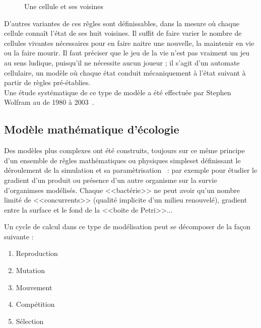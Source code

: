 \documentclass[11pt,twoside,a4paper]{article}
\begin{document}
\begin{figure}[H]
	\centerline {}
	\caption{Une cellule et ses voisines}
	\label{fig:cellneighboor}
\end{figure}

D'autres variantes de ces r{\^e}gles sont d{\'e}finissables, dans la mesure o{\`u} chaque cellule conna{\^i}t l'{\'e}tat de ses huit voisines. Il suffit de faire varier le nombre de cellules vivantes n{\'e}cessaires pour en faire naitre une nouvelle, la maintenir en vie ou la faire mourir. Il faut pr{\'e}ciser que le jeu de la vie n'est pas vraiment un jeu au sens ludique, puisqu'il ne n{\'e}cessite aucun joueur ; il s'agit d'un automate cellulaire, un mod{\`e}le o{\`u} chaque {\'e}tat conduit m{\'e}caniquement {\`a} l'{\'e}tat suivant {\`a} partir de r{\`e}gles pr{\'e}-{\'e}tablies.~\\

Une {\'e}tude syst{\'e}matique de ce type de mod{\`e}le a {\'e}t{\'e} effectu{\'e}e par Stephen Wolfram au de 1980 {\`a} 2003~\cite{wolframNewKindScience}. 


\subsection{Mod{\`e}le math{\'e}matique d'{\'e}cologie}

\begin{minipage}{0.5\linewidth}
Des mod{\`e}les plus complexes ont {\'e}t{\'e} construits, toujours sur ce m{\^e}me principe d'un ensemble de r{\^e}gles math{\'e}matiques ou physiques simpleset d{\'e}finissant le d{\'e}roulement de la simulation et sa param{\`e}trisation~\cite{numericalEcology,spatialAutoCorrelation,speciesAssembl} : par exemple pour {\'e}tudier le gradient d'un produit ou pr{\'e}sence d'un autre organisme sur la survie d'organimses mod{\'e}lis{\'e}s. Chaque <<bact{\'e}rie>> ne peut avoir qu'un nombre limit{\'e} de <<concurrents>> (qualit{\'e} implicite d'un milieu renouvel{\'e}), gradient entre la surface et le fond de la <<boite de Petri>>...
\end{minipage}
\begin{minipage}{0.1\linewidth}\end{minipage}
\begin{minipage}{0.4\linewidth}
Un cycle de calcul dans ce type de mod{\'e}lisation peut se d{\'e}composer de la fa\c{c}on suivante :
\begin{enumerate}
	\item Reproduction
	\item Mutation
	\item Mouvement
	\item Comp{\'e}tition
	\item S{\'e}lection
\end{enumerate}
\end{minipage}~\\
\end{document}
